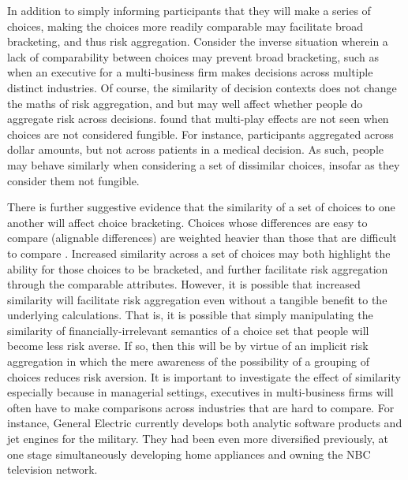 \documentclass[a4paper, nobind, dvipsnames]{templates/ociamthesis}
\theoremstyle{definition}
\theoremstyle{definition}
\theoremstyle{definition}
\theoremstyle{definition}
\theoremstyle{remark}
\begin{document}
In addition to simply informing participants that they will make a series of
choices, making the choices more readily comparable may facilitate broad
bracketing, and thus risk aggregation. Consider the inverse situation wherein a
lack of comparability between choices may prevent broad bracketing, such as when
an executive for a multi-business firm makes decisions across multiple distinct
industries. Of course, the similarity of decision contexts does not change the
maths of risk aggregation, and but may well affect whether people do aggregate
risk across decisions. \textcite{dekay2005} found that multi-play effects are not seen
when choices are not considered fungible. For instance, participants aggregated
across dollar amounts, but not across patients in a medical decision. As such,
people may behave similarly when considering a set of dissimilar choices,
insofar as they consider them not fungible.

There is further suggestive evidence that the similarity of a set of choices to
one another will affect choice bracketing. Choices whose differences are easy to
compare (alignable differences) are weighted heavier than those that are
difficult to compare \autocite{markman1995,markman2010}. Increased similarity across a
set of choices may both highlight the ability for those choices to be bracketed,
and further facilitate risk aggregation through the comparable attributes.
However, it is possible that increased similarity will facilitate risk
aggregation even without a tangible benefit to the underlying calculations. That
is, it is possible that simply manipulating the similarity of
financially-irrelevant semantics of a choice set that people will become less
risk averse. If so, then this will be by virtue of an implicit risk aggregation
in which the mere awareness of the possibility of a grouping of choices reduces
risk aversion. It is important to investigate the effect of similarity
especially because in managerial settings, executives in multi-business firms
will often have to make comparisons across industries that are hard to compare.
For instance, General Electric currently develops both analytic software
products and jet engines for the military. They had been even more diversified
previously, at one stage simultaneously developing home appliances and owning
the NBC television network.
\end{document}
